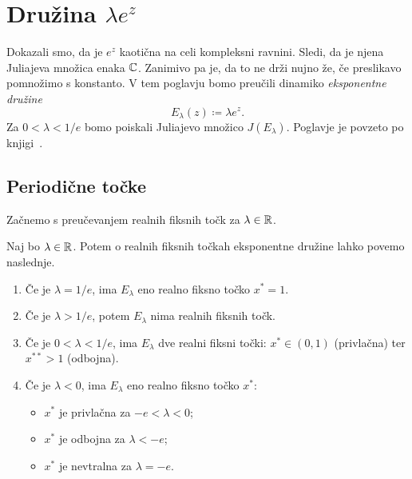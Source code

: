 \section{Družina \texorpdfstring{\(\lambda e^z\)}{\lambda exp(z)}} \label{sec:druzina}

Dokazali smo, da je \(e^z\) kaotična na celi kompleksni ravnini. Sledi, da je njena Juliajeva množica enaka \(\mathbb C\). Zanimivo pa je, da to ne drži nujno že, če preslikavo pomnožimo s konstanto. V tem poglavju bomo preučili dinamiko \emph{eksponentne družine}
\[E_\lambda (z) \coloneq \lambda e^z.\]
Za \(0 < \lambda < 1/e\) bomo poiskali Juliajevo množico \(J (E_\lambda)\). Poglavje je povzeto po knjigi~\cite[poglavje 9]{Pineiro_2025}.

\subsection{Periodične točke}

Začnemo s preučevanjem realnih fiksnih točk za \(\lambda \in \mathbb R\).

\begin{trditev}
    Naj bo \(\lambda \in \mathbb R\). Potem o realnih fiksnih točkah eksponentne družine lahko povemo naslednje.
    \begin{enumerate}[label=(\arabic*)]
        \item Če je \(\lambda = 1/e\), ima \(E_\lambda\) eno realno fiksno točko \(x^* = 1\).
        \item Če je \(\lambda > 1/e\), potem \(E_\lambda\) nima realnih fiksnih točk.
        \item Če je \(0 < \lambda < 1/e\), ima \(E_\lambda\) dve realni fiksni točki: \(x^* \in (0, 1)\) (privlačna) ter \(x^{**} > 1\) (odbojna).
        \item Če je \(\lambda < 0\), ima \(E_\lambda\) eno realno fiksno točko \(x^*\):
              \begin{itemize}
                  \item \(x^*\) je privlačna za \(-e < \lambda < 0\);
                  \item \(x^*\) je odbojna za \(\lambda < -e\);
                  \item \(x^*\) je nevtralna za \(\lambda = -e\).
              \end{itemize}
    \end{enumerate}
\end{trditev}

